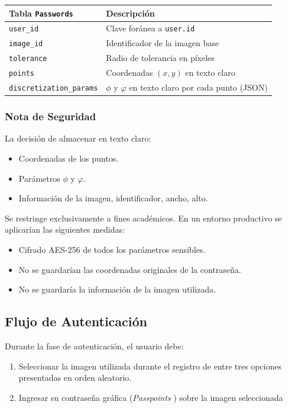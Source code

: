 \begin{table}[ht]
	\centering
	\begin{tabularx}{\textwidth}{lX}
		\toprule
		\textbf{Tabla \texttt{Passwords}} & \textbf{Descripción} \\
		\midrule
		\texttt{user\_id} & Clave foránea a \texttt{user.id} \\
		\texttt{image\_id} & Identificador de la imagen base \\
		\texttt{tolerance} & Radio de tolerancia en píxeles \\
		\texttt{points} & Coordenadas $(x,y)$ en texto claro \\
		\texttt{discretization\_params} & $\phi$ y $\varphi$ en texto claro por cada punto (JSON) \\
		\bottomrule
	\end{tabularx}
\end{table}

\subsubsection{Nota de Seguridad}
La decisión de almacenar en texto claro:
\begin{itemize}
	\item Coordenadas de los puntos.
	\item Parámetros $\phi$ y $\varphi$.
	\item Informaci\'on de la imagen, identificador, ancho, alto.
\end{itemize}

Se restringe exclusivamente a fines académicos. En un entorno productivo se aplicarían las siguientes medidas:
\begin{itemize}
	\item Cifrado AES-256 de todos los parámetros sensibles.
	\item No se guardar\'ian las coordenadas originales de la contrase\~na.
	\item No se guardar\'ia la informaci\'on de la imagen utilizada.
\end{itemize}

\subsection{Flujo de Autenticación}
Durante la fase de autenticación, el usuario debe:

\begin{enumerate}
	\item Seleccionar la imagen utilizada durante el registro de entre tres opciones presentadas en orden aleatorio.
	\item Ingresar su contraseña gráfica (\textit{Passpoints
}) sobre la imagen seleccionada
\end{enumerate}

